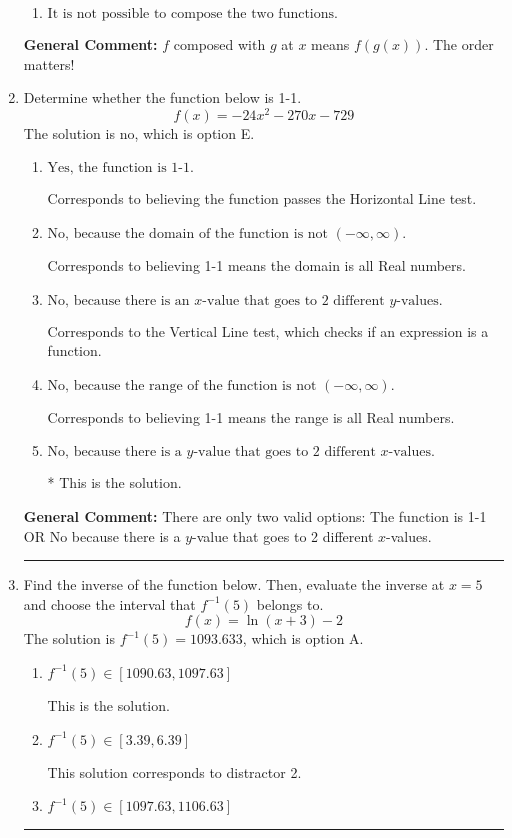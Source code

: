 \documentclass{extbook}[14pt]
\newcommand{\litem}[1]{\item #1

\rule{\textwidth}{0.4pt}}
\begin{document}
\begin{enumerate}
{\begin{enumerate}[label=\Alph*.]
 Distractor 1: Corresponds to reversing the composition.
\item \( \text{It is not possible to compose the two functions.} \)


\end{enumerate}

\textbf{General Comment:} $f$ composed with $g$ at $x$ means $f(g(x))$. The order matters!
}
\litem{
Determine whether the function below is 1-1.
\[ f(x) = -24 x^2 - 270 x - 729 \]The solution is \( \text{no} \), which is option E.\begin{enumerate}[label=\Alph*.]
\item \( \text{Yes, the function is 1-1.} \)

Corresponds to believing the function passes the Horizontal Line test.
\item \( \text{No, because the domain of the function is not $(-\infty, \infty)$.} \)

Corresponds to believing 1-1 means the domain is all Real numbers.
\item \( \text{No, because there is an $x$-value that goes to 2 different $y$-values.} \)

Corresponds to the Vertical Line test, which checks if an expression is a function.
\item \( \text{No, because the range of the function is not $(-\infty, \infty)$.} \)

Corresponds to believing 1-1 means the range is all Real numbers.
\item \( \text{No, because there is a $y$-value that goes to 2 different $x$-values.} \)

* This is the solution.
\end{enumerate}

\textbf{General Comment:} There are only two valid options: The function is 1-1 OR No because there is a $y$-value that goes to 2 different $x$-values.
}
\litem{
Find the inverse of the function below. Then, evaluate the inverse at $x = 5$ and choose the interval that $f^{-1}(5)$ belongs to.
\[ f(x) = \ln{(x+3)}-2 \]The solution is \( f^{-1}(5) = 1093.633 \), which is option A.\begin{enumerate}[label=\Alph*.]
\item \( f^{-1}(5) \in [1090.63, 1097.63] \)

 This is the solution.
\item \( f^{-1}(5) \in [3.39, 6.39] \)

 This solution corresponds to distractor 2.
\item \( f^{-1}(5) \in [1097.63, 1106.63] \)


\end{enumerate}}
\end{enumerate}
\end{document}
